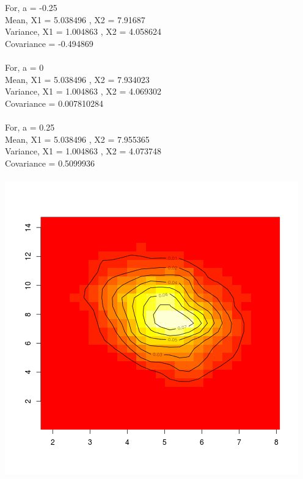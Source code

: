 \documentclass{article}
\begin{document}
For, a =  -0.25 \\
Mean, X1 =  5.038496 , X2 =  7.91687 \\
Variance, X1 =  1.004863 , X2 =  4.058624 \\
Covariance =  -0.494869 \\\\
For, a =  0 \\
Mean, X1 =  5.038496 , X2 =  7.934023 \\
Variance, X1 =  1.004863 , X2 =  4.069302 \\
Covariance =  0.007810284 \\\\
For, a =  0.25 \\
Mean, X1 =  5.038496 , X2 =  7.955365 \\
Variance, X1 =  1.004863 , X2 =  4.073748 \\
Covariance =  0.5099936 \\\\

\includegraphics{"plot1_1"}
\pagebreak
\end{document}
